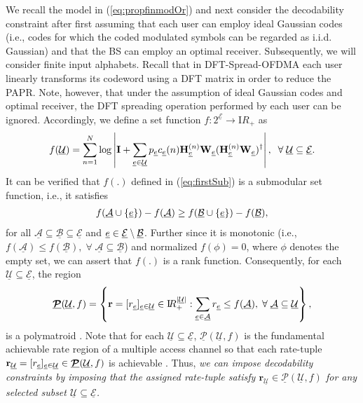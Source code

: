 \documentclass[11pt] {article}
\newcommand{\Reals}     {{{\mathrm I\!R}}}  \newcommand{\Cplx}      {{{\mathsf I}\!\!\!{\mathrm C}}} \newcommand{\NCplx}     {{{\mathcal{CN}}}} \newcommand{\Ints}      {{{\mathbb Z}}} \newcommand{\Rats}      {{{\mathsf I}\!\!\!{\mathrm Q}}}    \newcommand{\Nats}      {{{\mathrm{ I\!N}}}} \newcommand{\Tee}{      {{\mathbb T}}}
\newcommand{\uwti}[1]{{\mathbf #1}}
\newcommand{\rb}{{\uwti r}}  \newcommand{\Rb}{{\uwti R}}
\newcommand{\Pulk} {{\underline{{\bm {\mathcal P}}}}}
\newcommand{\Aulc} {{\underline{\mathcal A}}}
\newcommand{\Bulc} {{\underline{\mathcal B}}}
\newcommand{\Uulc} {{\underline{\mathcal U}}}
\newcommand{\Eulc} {{\underline{\mathcal E}}}
\begin{document}
We recall the model in (\ref{eq:propfinmodOr}) and next consider the decodability constraint after first assuming that each user can employ ideal Gaussian codes (i.e., codes for which the coded modulated symbols can be regarded as i.i.d. Gaussian) and that the BS can employ an optimal receiver. Subsequently, we will consider finite input alphabets. Recall that in DFT-Spread-OFDMA each user linearly transforms its codeword using a DFT matrix in order to reduce the PAPR. Note, however,  that under the assumption of ideal Gaussian codes  and optimal receiver, the DFT spreading operation performed by each user can be ignored.  Accordingly, we define a set function $f:2^{\Eulc}\to\Reals_+$ as
\begin{eqnarray}\label{eq:firstSub}
f(\Uulc)=\sum_{n=1}^N\log\left|\Ib + \sum_{\eul\in\Uulc}p_{\eul}c_{\eul}(n)\Hb_{\eul}^{(n)}\Wb_{\eul}(\Hb_{\eul}^{(n)}\Wb_{\eul})^{\dag}\right|,\;\;
\forall\;\Uulc\subseteq \Eulc.
\end{eqnarray}
It can be verified that $f(.)$ defined in (\ref{eq:firstSub}) is a submodular set function, i.e., it satisfies \begin{eqnarray*}
f(\Aulc\cup\{\eul\})-f(\Aulc)\geq f(\Bulc\cup\{\eul\})-f(\Bulc),
\end{eqnarray*}
 for all $\Aulc\subseteq\Bulc\subseteq\Eulc$ and $\eul\in\Eulc\setminus\Bulc$.
Further since it is monotonic (i.e., $f(\Aulc)\leq f(\Bulc),\;\forall\;\Aulc\subseteq \Bulc$) and normalized $f(\phi)=0$, where $\phi$ denotes the empty set, we can assert that $f(.)$  is a rank function. Consequently,
for each $\Uulc\subseteq\Eulc$, the region
  \begin{eqnarray}\label{eq:polreg}
  \Pulk(\Uulc,f)=\left\{\rb=[r_{\eul}]_{\eul\in\Uulc}\in\Reals_+^{|\Uulc|}: \sum_{\eul\in\Aulc}r_{\eul}\leq f(\Aulc),\;\forall\;\Aulc\subseteq\Uulc \right\},
 \end{eqnarray}
is a polymatroid \cite{edmonds:poly}. Note that for   each $\Uulc\subseteq\Eulc$, $\Pulk(\Uulc,f)$  is the fundamental achievable rate region of a  multiple access channel so that each rate-tuple $\rb_{\Uulc}=[r_{\eul}]_{\eul\in\Uulc}\in\Pulk(\Uulc,f)$ is achievable \cite{tse:poly}. Thus, {\em we can impose decodability constraints by imposing that the assigned rate-tuple satisfy $\rb_{\Uulc} \in\Pulk(\Uulc,f)$ for any selected subset $\Uulc\subseteq\Eulc$.}
\end{document}
